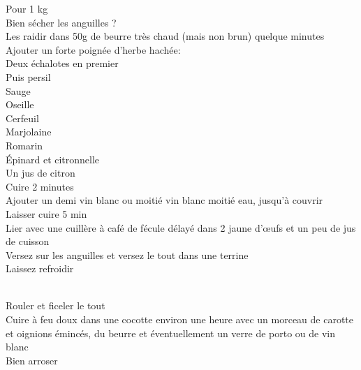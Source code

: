 \begin{minipage}[c]{\textwidth}
Pour 1 kg\\
Bien sécher les anguilles ?\\
Les raidir dans 50g de beurre très chaud (mais non brun) quelque minutes\\
Ajouter un forte poignée d'herbe hachée:\\
    Deux échalotes en premier\\
    Puis persil\\
    Sauge\\
    Oseille\\
    Cerfeuil\\
    Marjolaine\\
    Romarin\\
    Épinard et citronnelle\\
    Un jus de citron\\
Cuire 2 minutes\\
Ajouter un demi vin blanc ou moitié vin blanc moitié eau, jusqu'à couvrir\\
Laisser cuire 5 min\\
Lier avec une cuillère à café de fécule délayé dans 2 jaune d'œufs et un peu de jus de cuisson\\
Versez sur les anguilles et versez le tout dans une terrine\\
Laissez refroidir\\
\\

\end{minipage}

\begin{minipage}[c]{\textwidth}
Rouler et ficeler le tout\\
Cuire à feu doux dans une cocotte environ une heure avec un morceau de carotte et oignions émincés, du beurre et éventuellement un verre de porto ou de vin blanc\\
Bien arroser\\
\\

\end{minipage}

